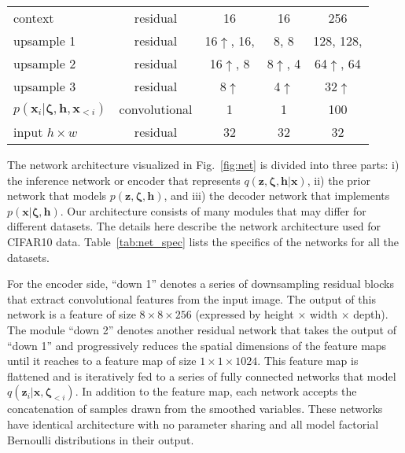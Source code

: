 \documentclass{article}
\newcommand{\x}{{\pmb{x}}}
\newcommand{\z}{{\pmb{z}}}
\newcommand{\h}{{\pmb{h}}}
\newcommand{\bzeta}{{\pmb{\zeta}}}
\newcommand{\uu}{$\uparrow$}
\begin{document}
\begin{figure*}
\begin{tabular}{ l|c|c|c|c}
context						 			 & residual &      16         							    &               16                &     256      \\
upsample 1						 	     & residual &     16\uu, 16,                           &          8, 8                   &       128, 128,      \\
upsample 2						 	     & residual &     16\uu, 8                              &          8\uu, 4              &         64\uu, 64    \\
upsample 3						 	     & residual &      8\uu                                   &           4\uu                 &       32\uu            \\
$p(\x_i | \bzeta, \h, \x_{<i}) $ & convolutional &              1                       &                 1                &     100    \\
input $h\times w$ & residual    &              32                       &                 32                &     32    \\

\end{tabular}
\end{figure*}

The network architecture visualized in Fig.~\ref{fig:net} is divided into three parts: i) the inference network or encoder that represents $q(\z, \bzeta, \h | \x)$, ii)
the prior network that models $p(\z, \bzeta, \h)$, and iii)
the decoder network that implements $p(\x| \bzeta, \h)$. Our architecture consists of many modules that may differ for different datasets. The details here describe the 
network architecture used for CIFAR10 data. Table~\ref{tab:net_spec} lists the specifics of the networks for all the datasets.

For the encoder side, ``down 1'' denotes a series of downsampling residual blocks that extract convolutional features from the input image. The output of this network is a feature of size $8\times8\times256$ (expressed by height $\times$ width $\times$ depth). The module ``down 2'' denotes another residual network that takes the output of ``down 1'' and progressively reduces the spatial dimensions of the feature maps until it reaches to a feature map of size $1\times1\times1024$. This feature map is flattened and is iteratively fed to a series of fully connected networks that model $q(\z_i | \x, \bzeta_{<i})$. In addition to the feature map, each network accepts the concatenation of samples drawn from the smoothed variables. These networks have identical architecture with no parameter sharing and all model factorial Bernoulli distributions in their output.
\end{document}

